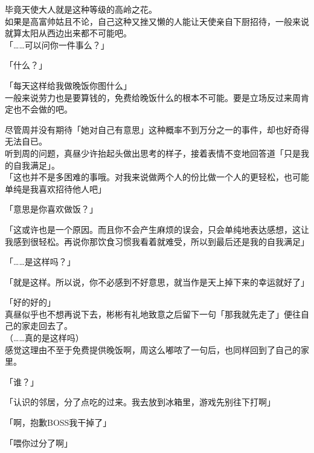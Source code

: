 毕竟天使大人就是这种等级的高岭之花。\\

如果是高富帅姑且不论，自己这种又挫又懒的人能让天使亲自下厨招待，一般来说就算太阳从西边出来都不可能吧。\\

「……可以问你一件事么？」

「什么？」

「每天这样给我做晚饭你图什么」\\

一般来说劳力也是要算钱的，免费给晚饭什么的根本不可能。要是立场反过来周肯定也不会做的吧。

尽管周并没有期待「她对自己有意思」这种概率不到万分之一的事件，却也好奇得无法自已。\\

听到周的问题，真昼少许抬起头做出思考的样子，接着表情不变地回答道「只是我的自我满足」。\\

「这也并不是多困难的事哦。对我来说做两个人的份比做一个人的更轻松，也可能单纯是我喜欢招待他人吧」

「意思是你喜欢做饭？」

「这或许也是一个原因。而且你不会产生麻烦的误会，只会单纯地表达感想，这让我感到很轻松。再说你那饮食习惯我看着就难受，所以到最后还是我的自我满足」

「……是这样吗？」

「就是这样。所以说，你不必感到不好意思，就当作是天上掉下来的幸运就好了」

「好的好的」\\

真昼似乎也不想再说下去，彬彬有礼地致意之后留下一句「那我就先走了」便往自己的家走回去了。\\

（……真的是这样吗）\\

感觉这理由不至于免费提供晚饭啊，周这么嘟哝了一句后，也同样回到了自己的家里。\\

\vspace{2\baselineskip}

「谁？」

「认识的邻居，分了点吃的过来。我去放到冰箱里，游戏先别往下打啊」

「啊，抱歉BOSS我干掉了」

「喂你过分了啊」
